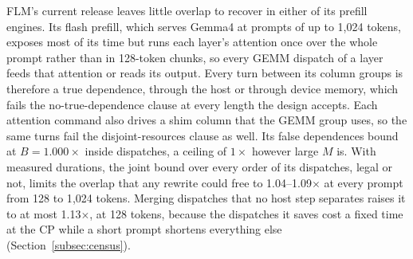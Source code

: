 FLM's current release leaves little overlap to recover in either of its prefill engines.
Its flash prefill, which serves Gemma4 at prompts of up to 1{,}024 tokens, exposes most of its time but runs each layer's attention once over the whole prompt rather than in 128-token chunks, so every GEMM dispatch of a layer feeds that attention or reads its output.
Every turn between its column groups is therefore a true dependence, through the host or through device memory, which fails the no-true-dependence clause at every length the design accepts.
Each attention command also drives a shim column that the GEMM group uses, so the same turns fail the disjoint-resources clause as well.
Its false dependences bound at $B = 1.000\times$ inside dispatches, a ceiling of $1\times$ however large $M$ is.
With measured durations, the joint bound over every order of its dispatches, legal or not, limits the overlap that any rewrite could free to 1.04--1.09$\times$ at every prompt from 128 to 1{,}024 tokens.
Merging dispatches that no host step separates raises it to at most 1.13$\times$, at 128 tokens, because the dispatches it saves cost a fixed time at the CP while a short prompt shortens everything else (Section~\ref{subsec:census}).
